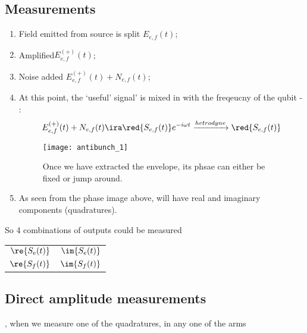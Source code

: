       \subsection{Measurements}
      \begin{enumerate}
      \item Field emitted from source is split \hfill $ E_{e,f}(t) $;
      \item Amplified\hfill $ E_{e,f}^{(+)}(t) $;
      \item Noise added \hfill $ E_{e,f}^{(+)}(t) + N_{e,f}(t) $;
      \item At this point, the `useful' signal' is mixed in with the freqeucny of
        the qubit - :
 	\begin{equation}\label{bunching1}
          E_{e,f}^{(+)}(t) + N_{e,f}(t) \ira \red{S_{e,f}(t)}e^{-i\omega t} \xrightarrow{hetrodyne} \red{S_{e,f}(t)}
 	\end{equation}
 	\begin{figure}[h]
          \begin{center}
            \texttt{[image: antibunch\_1]}
          \end{center}
          \caption{Once we have  extracted the envelope, its phsae  can either be
            fixed or jump around. \label{fig:bunching_1}}
 	\end{figure}
      \item  As  seen from  the  phase  image  above,  will have real and imaginary components (quadratures).
      \end{enumerate}
      So 4 combinations of outputs could be measured
      \begin{table}[h]
        \centering
        \begin{tabular}{|c|c|}
          \hline $ \re{S_e(t)} $ & $ \im{S_e(t)} $\\
          $ \re{S_f(t)} $ & $ \im{S_f(t)} $\\\hline
        \end{tabular}
      \end{table}
  
  
 \subsection{Direct amplitude measurements}
 , when we measure one of the quadratures,
 in any one of the arms
  
